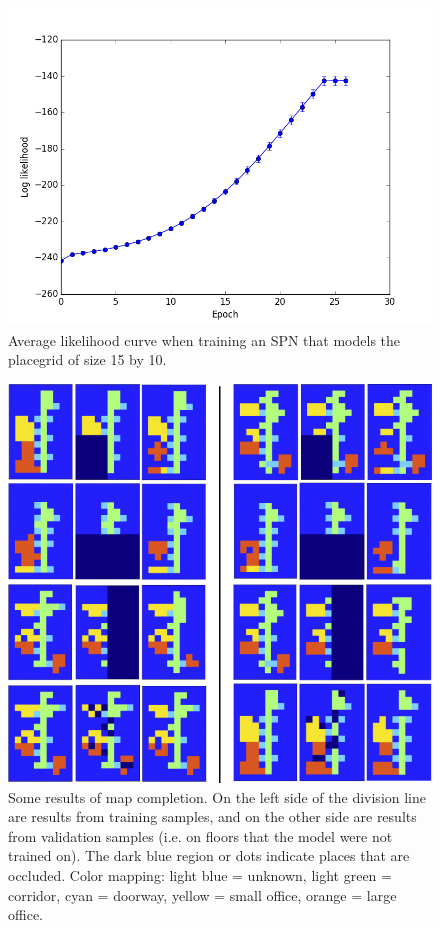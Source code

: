 \documentclass[10pt, titlepage]{article}
\theoremstyle{definition}
\begin{document}
\begin{figure}[!htb]
    \centering
    \captionsetup{width=.6\linewidth}
    \includegraphics[scale=0.4]{images/likelihood.png}
    \caption{Average likelihood curve when training an SPN that models the placegrid of size 15 by 10. }
    \label{fig:likelihood}
\end{figure}


\begin{figure}[!htb]
    \centering
    \captionsetup{width=.8\linewidth}
    \includegraphics[scale=0.75]{images/placegrid_completion.png}
    \caption{Some results of map completion. On the left side of the division line are results from training samples, and on the other side are results from validation samples (i.e. on floors that the model were not trained on). The dark blue region or dots indicate places that are occluded. Color mapping: light blue = unknown, light green = corridor, cyan = doorway, yellow = small office, orange = large office.}
    \label{fig:basic_compl}
\end{figure}
\end{document}
